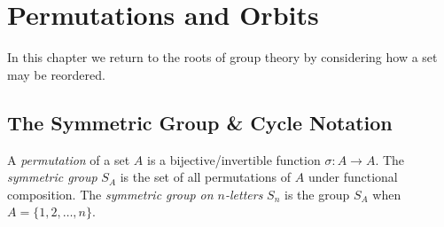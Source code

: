 \graphicspath{{5perm/asy/}}

\section{Permutations and Orbits}\label{chap:perm}

In this chapter we return to the roots of group theory by considering how a set may be reordered.

\subsection{The Symmetric Group \& Cycle Notation}\label{sec:perm1}

\begin{defn}{}{}
	A \emph{permutation} of a set $A$ is a bijective/invertible function $\sigma:A\to A$.\smallbreak
	The \emph{symmetric group} $S_A$ is the set of all permutations of $A$ under functional composition.\smallbreak
	The \emph{symmetric group on $n$-letters\footnotemark} $S_n$ is the group $S_A$ when $A=\{1,2,\ldots,n\}$.
\end{defn}



